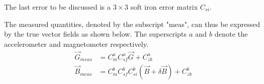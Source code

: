 The last error to be discussed is a $3\times3$ soft iron error matrix $C_{si}$.

The measured quantities, denoted by the subscript "meas", can thus be expressed by the true vector fields as shown below. The superscripts $a$ and $b$ denote the accelerometer and magnetometer respectively.
\begin{align}
    \vec{G}_{meas}&=C^a_mC^a_{sf}\vec G+C_{zb}^a \label{eq:bg:g_with_errors}\\
    \vec{B}_{meas}&=C^b_mC^b_{sf}C^b_{si}(\vec{B}+\delta\vec{B})+C_{zb}^b
    \label{eq:bg:b_with_errors}
\end{align}
